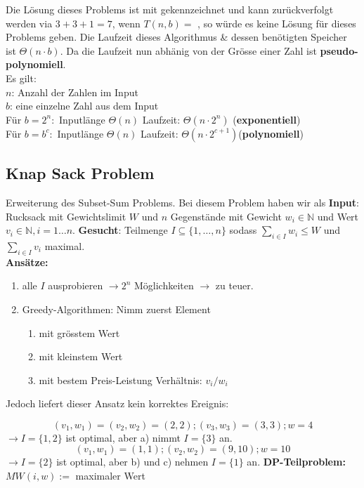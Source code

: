 \documentclass[a4paper]{article}
\newcommand*\circled[1]{\tikz[baseline=(char.base)]{
            \node[shape=circle,draw,inner sep=1.2pt] (char) {#1};}}
\begin{document}
Die Lösung dieses Problems ist mit \textcolor{red}{\circled{1}} gekennzeichnet und kann zurückverfolgt werden via $3 + 3 + 1 = 7$, wenn $T(n,b) =$ \textcolor{red}{\circled{0}}, so würde es keine Lösung für dieses Problems geben. 
Die Laufzeit dieses Algorithmus \& dessen benötigten Speicher ist $\Theta(n\cdot b)$. Da die Laufzeit nun abhänig von der Grösse einer Zahl ist \textbf{pseudo-polynomiell}. \\
Es gilt: \\ 
$n$: Anzahl der Zahlen im Input \\
$b$: eine einzelne Zahl aus dem Input\\
Für $b= 2^n: $ Inputlänge $\Theta(n)$ Laufzeit: $\Theta(n\cdot2^n)$ (\textbf{exponentiell}) \\
Für $b= b^c: $ Inputlänge $\Theta(n)$ Laufzeit: $\Theta(n\cdot2^{c+1})$(\textbf{polynomiell})

\subsection{Knap Sack Problem}
Erweiterung des Subset-Sum Problems. Bei diesem Problem haben wir als \textbf{Input}: Rucksack mit Gewichtslimit $W$ und $n$ Gegenstände mit Gewicht $w_i \in \mathbb{N}$ und Wert $v_i \in \mathbb{N}, i = 1\dots n$. \textbf{Gesucht}: Teilmenge $I \subseteq \lbrace 1,\dots ,n \rbrace$ sodass $\sum_{i\in I} w_i \leq W$ und $\sum_{i\in I} v_i$ maximal. \\ 
\textbf{Ansätze:} 
\begin{enumerate}
    \item alle $I$ ausprobieren $\rightarrow 2^n$ Möglichkeiten $\rightarrow$ zu teuer.
    \item Greedy-Algorithmen: Nimm zuerst Element 
    \begin{enumerate}
        \item mit grösstem Wert
        \item mit kleinstem Wert
        \item mit bestem Preis-Leistung Verhältnis: $v_i /w_i$
    \end{enumerate}
\end{enumerate}
Jedoch liefert dieser Ansatz kein korrektes Ereignis:

\begin{equation*}
    (v_1,w_1) = (v_2,w_2) = (2,2) ; (v_3,w_3) = (3,3) ; w = 4
\end{equation*}
$\rightarrow I = \lbrace 1,2\rbrace$ ist optimal, aber a) nimmt $I = \lbrace 3\rbrace$ an.
\begin{equation*}
    (v_1,w_1) = (1,1) ; (v_2,w_2) = (9,10) ; w = 10
\end{equation*}
$\rightarrow I = \lbrace 2\rbrace$ ist optimal, aber b) und c) nehmen $I = \lbrace 1\rbrace$ an.
\textbf{DP-Teilproblem:} $MW(i, w) :=$ maximaler Wert 
\end{document}
